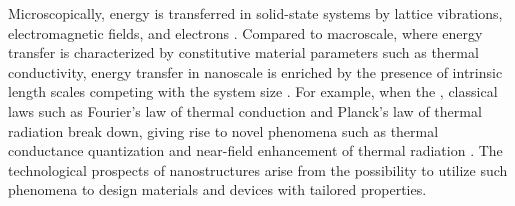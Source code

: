 Microscopically, energy is transferred in solid-state systems by lattice vibrations, electromagnetic fields, and electrons \cite{chen}. Compared to macroscale, where energy transfer is characterized by constitutive material parameters such as thermal conductivity, energy transfer in nanoscale is enriched by the presence of intrinsic length scales competing with the system size \cite{chen}. For example, when the , classical laws such as Fourier's law of thermal conduction \cite{fourier} and Planck's law of thermal radiation \cite{planck00a} break down, giving rise to novel phenomena such as thermal conductance quantization \cite{rego98,angelescu98,schwab00} and near-field enhancement of thermal radiation \cite{volokitin07}. The technological prospects of nanostructures arise from the possibility to utilize such phenomena to design materials and devices with tailored properties. %


% 



